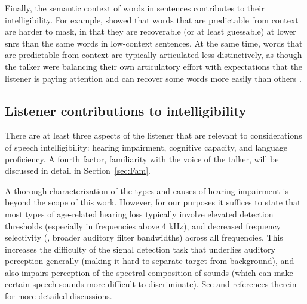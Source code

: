
Finally, the semantic context of words in sentences contributes to their intelligibility.  For example, \citet{LewisEtAl1988} showed that words that are predictable from context are harder to mask, in that they are recoverable (or at least guessable) at lower \ac{snr}s than the same words in low-context sentences.  At the same time, words that are predictable from context are typically articulated less distinctively, as though the talker were balancing their own articulatory effort with expectations that the listener is paying attention and can recover some words more easily than others \citep{Wright2004a}.


\subsection{Listener contributions to intelligibility\label{sec:Listener}}
There are at least three aspects of the listener that are relevant to considerations of speech intelligibility: hearing impairment, cognitive capacity, and language proficiency.  A fourth factor, familiarity with the voice of the talker, will be discussed in detail in Section~\ref{sec:Fam}.  

A thorough characterization of the types and causes of hearing impairment is beyond the scope of this work.\footnotemark{}  However, for our purposes it suffices to state that most types of age-related hearing loss typically involve elevated detection thresholds (especially in frequencies above 4 kHz), and decreased frequency selectivity (\ie, broader auditory filter bandwidths) across all frequencies.  This increases the difficulty of the signal detection task that underlies auditory perception generally (making it hard to separate target from background), and also impairs perception of the spectral composition of sounds (which can make certain speech sounds more difficult to discriminate).  See \citet[117–119]{Moore2008} and references therein for more detailed discussions.

